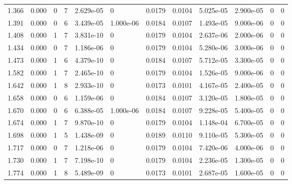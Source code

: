 \documentclass[preview]{standalone}
\begin{document}
{{\begin{tabular}{L{1.2cm}C{1.2cm} C{0.3cm}C{0.5cm} C{1.4cm}C{1.4cm} C{1.4cm}C{1.4cm} C{1.6cm}C{1.6cm} C{1.6cm}C{1.6cm}}
  1.366  &  0.000  & 0     &  7 &  2.629e-05  & 0  &  0.0179&   0.0104& 5.025e-05 & 2.900e-05   &  0 & 0  \\ 
  1.391  &  0.000  & 0     &  6 &  3.439e-05  & 1.000e-06  &  0.0184&   0.0107& 1.493e-05 & 9.000e-06   &  0 & 0  \\ 
  1.408  &  0.000  & 1     &  7 &  3.831e-10  & 0  &  0.0179&   0.0104& 2.637e-06 & 2.000e-06   &  0 & 0  \\ 
  1.434  &  0.000  & 0     &  7 &  1.186e-06  & 0  &  0.0179&   0.0104& 5.280e-06 & 3.000e-06   &  0 & 0  \\ 
  1.473  &  0.000  & 1     &  6 &  4.379e-10  & 0  &  0.0184&   0.0107& 5.712e-05 & 3.300e-05   &  0 & 0  \\ 
  1.582  &  0.000  & 1     &  7 &  2.465e-10  & 0  &  0.0179&   0.0104& 1.526e-05 & 9.000e-06   &  0 & 0  \\ 
  1.642  &  0.000  & 1     &  8 &  2.933e-10  & 0  &  0.0173&   0.0101& 4.167e-05 & 2.400e-05   &  0 & 0  \\ 
  1.658  &  0.000  & 0     &  6 &  1.159e-06  & 0  &  0.0184&   0.0107& 3.120e-05 & 1.800e-05   &  0 & 0  \\ 
  1.670  &  0.000  & 0     &  6 &  6.388e-05  & 1.000e-06  &  0.0184&   0.0107& 9.228e-05 & 5.400e-05   &  0 & 0  \\ 
  1.674  &  0.000  & 1     &  7 &  9.870e-10  & 0  &  0.0179&   0.0104& 1.148e-04 & 6.700e-05   &  0 & 0  \\ 
  1.698  &  0.000  & 1     &  5 &  1.438e-09  & 0  &  0.0189&   0.0110& 9.110e-05 & 5.300e-05   &  0 & 0  \\ 
  1.717  &  0.000  & 0     &  7 &  1.218e-06  & 0  &  0.0179&   0.0104& 7.420e-06 & 4.000e-06   &  0 & 0  \\ 
  1.730  &  0.000  & 1     &  7 &  7.198e-10  & 0  &  0.0179&   0.0104& 2.236e-05 & 1.300e-05   &  0 & 0  \\ 
  1.774  &  0.000  & 1     &  8 &  5.489e-09  & 0  &  0.0173&   0.0101& 2.687e-05 & 1.600e-05   &  0 & 0  \\ 
\hline 
\end{tabular} 

}}
\end{document}
